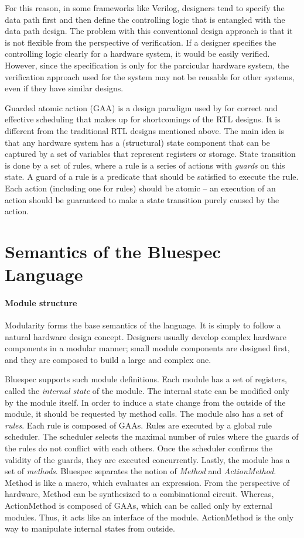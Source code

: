 For this reason, in some frameworks like Verilog, designers tend to
specify the data path first and then define the controlling logic that
is entangled with the data path design. The problem with this
conventional design approach is that it is not flexible from the
perspective of verification. If a designer specifies the controlling
logic clearly for a hardware system, it would be easily verified.
However, since the specification is only for the parcicular hardware
system, the verification approach used for the system may not be
reusable for other systems, even if they have similar designs.

Guarded atomic action (GAA) is a design paradigm used by \Bluespec{}
for correct and effective scheduling that makes up for shortcomings of
the RTL designs. It is different from the traditional RTL designs
mentioned above. The main idea is that any hardware system has a
(structural) state component that can be captured by a set of
variables that represent registers or storage. State transition is
done by a set of rules, where a rule is a series of actions with
\emph{guards} on this state. A guard of a rule is a predicate that
should be satisfied to execute the rule. Each action (including one
for rules) should be atomic -- an execution of an action should be
guaranteed to make a state transition purely caused by the action.

\section{Semantics of the Bluespec Language}
\label{sec:bluespec-semantics}

\paragraph{Module structure}

Modularity forms the base semantics of the \Bluespec{} language. It is
simply to follow a natural hardware design concept. Designers usually
develop complex hardware components in a modular manner; small module
components are designed first, and they are composed to build a large
and complex one.

Bluespec supports such module definitions. Each module has a set of
registers, called the \emph{internal state} of the module. The
internal state can be modified only by the module itself. In order to
induce a state change from the outside of the module, it should be
requested by method calls. The module also has a set of
\emph{rules}. Each rule is composed of GAAs. Rules are executed by a
global rule scheduler. The scheduler selects the maximal number of
rules where the guards of the rules do not conflict with each
others. Once the scheduler confirms the validity of the guards, they
are executed concurrently. Lastly, the module has a set of
\emph{methods}. Bluespec separates the notion of \emph{Method} and
\emph{ActionMethod}. Method is like a macro, which evaluates an
expression. From the perspective of hardware, Method can be
synthesized to a combinational circuit. Whereas, ActionMethod is
composed of GAAs, which can be called only by external modules. Thus,
it acts like an interface of the module. ActionMethod is the only way
to manipulate internal states from outside.

